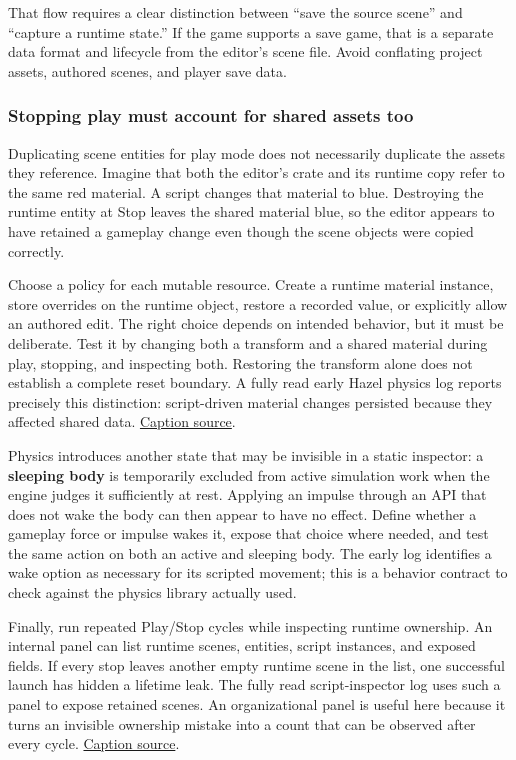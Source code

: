 That flow requires a clear distinction between ``save the source scene'' and ``capture a runtime state.'' If the game supports a save game, that is a separate data format and lifecycle from the editor's scene file. Avoid conflating project assets, authored scenes, and player save data.

\subsubsection{Stopping play must account for shared assets too}\label{06-engine-ii-ch032-stopping-play-must-account-for-shared-assets-too}

Duplicating scene entities for play mode does not necessarily duplicate the assets they reference. Imagine that both the editor's crate and its runtime copy refer to the same red material. A script changes that material to blue. Destroying the runtime entity at Stop leaves the shared material blue, so the editor appears to have retained a gameplay change even though the scene objects were copied correctly.

Choose a policy for each mutable resource. Create a runtime material instance, store overrides on the runtime object, restore a recorded value, or explicitly allow an authored edit. The right choice depends on intended behavior, but it must be deliberate. Test it by changing both a transform and a shared material during play, stopping, and inspecting both. Restoring the transform alone does not establish a complete reset boundary. A fully read early Hazel physics log reports precisely this distinction: script-driven material changes persisted because they affected shared data. \href{https://www.youtube.com/watch?v=RlQ4YVnQN40}{Caption source}.

Physics introduces another state that may be invisible in a static inspector: a \textbf{sleeping body} is temporarily excluded from active simulation work when the engine judges it sufficiently at rest. Applying an impulse through an API that does not wake the body can then appear to have no effect. Define whether a gameplay force or impulse wakes it, expose that choice where needed, and test the same action on both an active and sleeping body. The early log identifies a wake option as necessary for its scripted movement; this is a behavior contract to check against the physics library actually used.

Finally, run repeated Play/Stop cycles while inspecting runtime ownership. An internal panel can list runtime scenes, entities, script instances, and exposed fields. If every stop leaves another empty runtime scene in the list, one successful launch has hidden a lifetime leak. The fully read script-inspector log uses such a panel to expose retained scenes. An organizational panel is useful here because it turns an invisible ownership mistake into a count that can be observed after every cycle. \href{https://www.youtube.com/watch?v=g9HGp3icrIg}{Caption source}.

